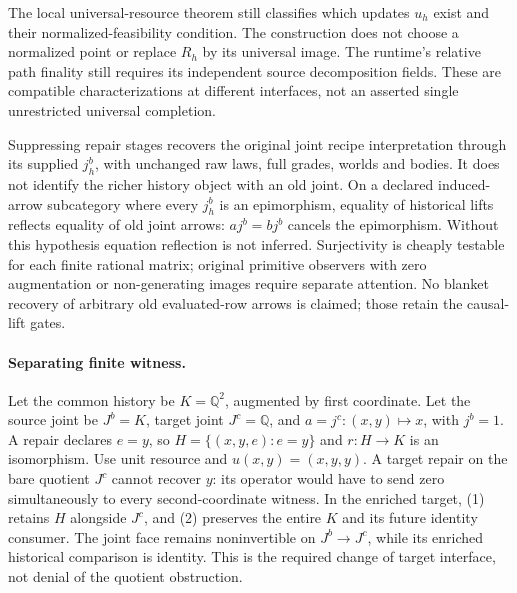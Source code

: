\documentclass{article}
\begin{document}
The local universal-resource theorem still classifies which updates $u_h$ exist and their normalized-feasibility condition. The construction does not choose a normalized point or replace $R_h$ by its universal image. The runtime's relative path finality still requires its independent source decomposition fields. These are compatible characterizations at different interfaces, not an asserted single unrestricted universal completion.

Suppressing repair stages recovers the original joint recipe interpretation through its supplied $j^b_h$, with unchanged raw laws, full grades, worlds and bodies. It does not identify the richer history object with an old joint. On a declared induced-arrow subcategory where every $j^b_h$ is an epimorphism, equality of historical lifts reflects equality of old joint arrows: $a j^b=b j^b$ cancels the epimorphism. Without this hypothesis equation reflection is not inferred. Surjectivity is cheaply testable for each finite rational matrix; original primitive observers with zero augmentation or non-generating images require separate attention. No blanket recovery of arbitrary old evaluated-row arrows is claimed; those retain the causal-lift gates.

\paragraph{Separating finite witness.}
Let the common history be $K=\mathbb Q^2$, augmented by first coordinate. Let the source joint be $J^b=K$, target joint $J^c=\mathbb Q$, and $a=j^c:(x,y)\mapsto x$, with $j^b=1$. A repair declares $e=y$, so $H=\{(x,y,e):e=y\}$ and $r:H\to K$ is an isomorphism. Use unit resource and $u(x,y)=(x,y,y)$. A target repair on the bare quotient $J^c$ cannot recover $y$: its operator would have to send zero simultaneously to every second-coordinate witness. In the enriched target, (1) retains $H$ alongside $J^c$, and (2) preserves the entire $K$ and its future identity consumer. The joint face remains noninvertible on $J^b\to J^c$, while its enriched historical comparison is identity. This is the required change of target interface, not denial of the quotient obstruction.
\end{document}
